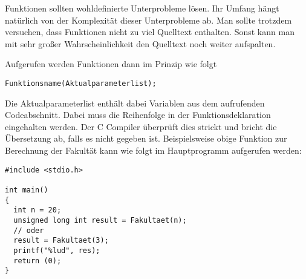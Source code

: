 Funktionen sollten wohldefinierte Unterprobleme lösen.
Ihr Umfang hängt natürlich von der Komplexität dieser Unterprobleme ab.
Man sollte trotzdem versuchen, dass Funktionen nicht zu viel Quelltext enthalten.
Sonst kann man mit sehr großer Wahrscheinlichkeit den Quelltext noch weiter aufspalten.

Aufgerufen werden Funktionen dann im Prinzip wie folgt
\begin{lstlisting}
Funktionsname(Aktualparameterlist);
\end{lstlisting}
Die Aktualparameterlist enthält dabei Variablen aus dem aufrufenden Codeabschnitt.
Dabei muss die Reihenfolge in der Funktionsdeklaration eingehalten werden.
Der C Compiler überprüft dies strickt und bricht die Übersetzung ab, falls es nicht gegeben ist.
Beispielsweise obige Funktion zur Berechnung der Fakultät kann wie folgt im Hauptprogramm aufgerufen werden:
\begin{lstlisting}
#include <stdio.h>

int main()
{
  int n = 20;
  unsigned long int result = Fakultaet(n);
  // oder
  result = Fakultaet(3);
  printf("%lud", res);
  return (0);
}
\end{lstlisting}

\endinput
